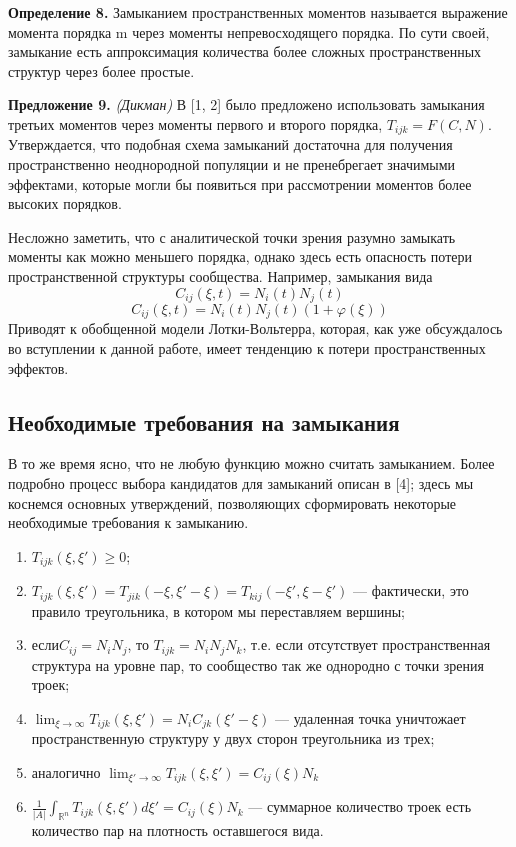 \textbf{Определение 8.} Замыканием пространственных моментов называется выражение момента порядка m через моменты непревосходящего порядка. По сути своей, замыкание есть аппроксимация количества более сложных пространственных структур через более простые.

\textbf{Предложение 9.} \textit{(Дикман)} В [1, 2] было предложено использовать замыкания третьих моментов через моменты первого и второго порядка, $ T_{ijk}=F(C,N) $. Утверждается, что подобная схема замыканий достаточна для получения пространственно неоднородной популяции и не пренебрегает значимыми эффектами, которые могли бы появиться при рассмотрении моментов более высоких порядков.

Несложно заметить, что с аналитической точки зрения разумно замыкать моменты как можно меньшего порядка, однако здесь есть опасность потери пространственной структуры сообщества. Например, замыкания вида
\begin{equation*}
C_{ij}(\xi,t)=N_{i}(t)N_{j}(t)
\end{equation*}
\begin{equation*}
C_{ij}(\xi,t)=N_{i}(t)N_{j}(t)(1+\varphi(\xi))
\end{equation*}
Приводят к обобщенной модели Лотки-Вольтерра, которая, как уже обсуждалось во вступлении к данной работе, имеет тенденцию к потери пространственных эффектов.

\subsection{Необходимые требования на замыкания}

В то же время ясно, что не любую функцию можно считать замыканием. Более подробно процесс выбора кандидатов для замыканий описан в [4]; здесь мы коснемся основных утверждений, позволяющих сформировать некоторые необходимые требования к замыканию.
\begin{enumerate}
	\item $  T_{ijk}(\xi,\xi')\ge0 $;
	
	\item $ T_{ijk}(\xi,\xi')=T_{jik}(-\xi,\xi'-\xi)=T_{kij}(-\xi',\xi-\xi') $ --- фактически, это правило треугольника, в котором мы переставляем вершины;
	
	\item если$  C_{ij}=N_{i}N_{j} $, то $ T_{ijk}=N_{i}N_{j}N_{k} $, т.е. если отсутствует пространственная структура на уровне пар, то сообщество так же однородно с точки зрения троек;
	
	\item $ \lim_{\xi\to\infty}T_{ijk}(\xi,\xi')=N_{i}C_{jk}(\xi'-\xi) $ --- удаленная точка уничтожает пространственную структуру у двух сторон треугольника из трех;
	
	\item аналогично $ \lim_{\xi'\to\infty}T_{ijk}(\xi,\xi')=C_{ij}(\xi)N_{k} $
	
	\item $  \frac{1}{|A|}\int_{\mathbb{R}^{n}}T_{ijk}(\xi,\xi')d\xi'=C_{ij}(\xi)N_{k} $ --- суммарное количество троек есть количество пар на плотность оставшегося вида.
\end{enumerate}


